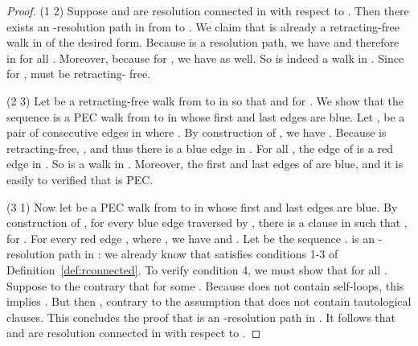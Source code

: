 \documentclass{llncs}
\def\hy{\hbox{-}\nobreak\hskip0pt} \newcommand{\ellipsis}{}
\begin{document}
\begin{proof}
  (1  2) Suppose  and  are resolution connected in 
  with respect to . Then there exists an \hy resolution path \hskip 0pt in
   from  to . We claim that  is already a
  retracting\hy free walk in  of the desired form. Because 
  is a resolution path, we have  and
  therefore  in  for all . Moreover, because  for , we have  as
  well. So  is indeed a walk in . Since  for ,  must be retracting\hy
  free.

  (2  3) Let  be a retracting\hy free walk from  to  in 
  so that  and  for . We show that the sequence  is a PEC walk from  to  in
   whose first and last edges are blue. Let ,
   be a pair of consecutive edges in  where . By construction of , we have . Because  is retracting\hy free, , and thus
  there is a blue edge  in . For all , the edge  of  is a red edge in
  . So  is a walk in . Moreover, the first and
  last edges of  are blue, and it is easily to verified that  is
  PEC.

  (3  1) Now let  be a PEC walk from  to  in  whose
  first and last edges are blue. By construction of , for every
  blue edge  traversed by , there is a clause  in
   such that , for . For
  every red edge , where , we
  have  and . Let  be the sequence \hskip 0pt.  is an \hy
  resolution path in : we already know that  satisfies conditions
  1-3 of Definition~\ref{def:rconnected}. To verify condition 4, we must show
  that  for all . Suppose to the contrary that  for some . Because  does not contain self\hy loops,
  this implies . But then , contrary to the assumption that  does not
  contain tautological clauses. This concludes the proof that  is an
  \hy resolution path in . It follows that  and  are
  resolution connected in  with respect to .
\end{proof}
\end{document}
